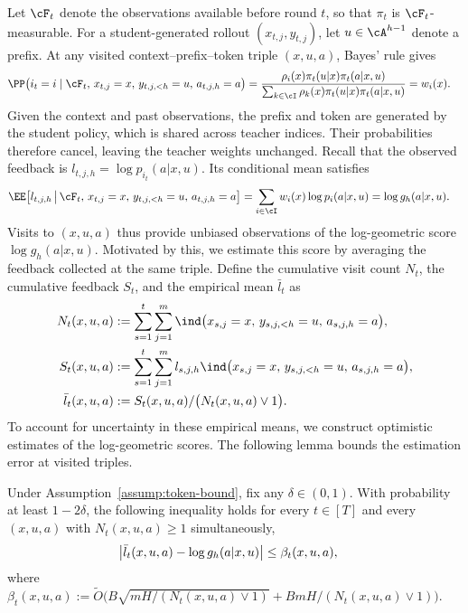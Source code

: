 \documentclass[11pt]{article}
\begin{document}
Let $\cF_t$ denote the observations available before round $t$, so that $\pi_t$ is $\cF_t$-measurable. For a student-generated rollout $(x_{t,j},y_{t,j})$, let $u\in\cA^{h-1}$ denote a prefix. At any visited context--prefix--token triple $(x,u,a)$, Bayes' rule gives
\begin{align*}
    &\PP\bigl(i_t=i\mid\cF_t,\,x_{t,j}=x,\,y_{t,j,<h}=u,\,a_{t,j,h}=a\bigr) = \frac{\rho_i(x)\pi_t(u|x)\pi_t(a|x,u)}
    {\sum_{k\in\cI}\rho_k(x)\pi_t(u|x)\pi_t(a|x,u)}
    = w_i(x).
\end{align*}
Given the context and past observations, the prefix and token are generated by the student policy, which is shared across teacher indices. Their probabilities therefore cancel, leaving the teacher weights unchanged.
Recall that the observed feedback is
$l_{t,j,h}=\log p_{i_t}(a|x,u)$. Its conditional mean satisfies
\begin{align}
    \EE\big[
        l_{t,j,h}
        \,\big|\,
        \cF_t,\,
        x_{t,j}=x,\,
        y_{t,j,<h}=u,\,
        a_{t,j,h}=a
    \big]
    &=
    \sum_{i\in\cI}
    w_i(x)\log p_i(a|x,u)=
    \log g_h(a|x,u).\notag
\end{align}
Visits to $(x,u,a)$ thus provide unbiased observations of the log-geometric score $\log g_h(a|x,u)$. Motivated by this, we estimate this score by averaging the feedback collected at the same triple. Define the cumulative visit count $N_t$, the cumulative feedback $S_t$, and the empirical mean $\bar l_t$ as
\begin{align}
\notag
    N_t(x,u,a)
    &:=
    \sum_{s=1}^t\sum_{j=1}^m
    \ind\bigl(
        x_{s,j}=x,\,
        y_{s,j,<h}=u,\,
        a_{s,j,h}=a
    \bigr),\\\notag
    S_t(x,u,a)
    &:=
    \sum_{s=1}^t\sum_{j=1}^m
    l_{s,j,h}
    \ind\bigl(
        x_{s,j}=x,\,
        y_{s,j,<h}=u,\,
        a_{s,j,h}=a
    \bigr),\\\label{eq:rkl-NSL}
    \bar l_t(x,u,a)
    &:=
    {S_t(x,u,a)}/\big(
         {N_t(x,u,a)\vee1}\big).       
\end{align}
To account for uncertainty in these empirical means, we construct optimistic estimates of the log-geometric scores. The following lemma bounds the estimation error at visited triples.
\begin{lemma}
\label{lem:ar-token-confidence}
Under Assumption~\ref{assump:token-bound}, fix any $\delta\in(0,1)$. With probability at least
$1-2\delta$, the following inequality holds for every $t\in[T]$ and every
$(x,u,a)$ with $N_t(x,u,a)\geq1$ simultaneously,
\begin{align}
    \big|
        \bar l_t(x,u,a)
        -
        \log g_h(a|x,u)
    \big|
    &\leq
    \beta_t(x,u,a), \notag
\end{align}
where $\beta_t(x,u,a):= \tilde O\big(B \sqrt{mH/(N_t(x,u,a) \vee 1)} + BmH/(N_t(x,u,a) \vee 1)\big)$.
\end{lemma}
\end{document}
